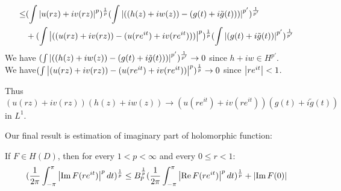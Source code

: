 \begin{remark}
{\begin{align*}
            \leq & (\int\left\lvert u(rz)+iv(rz)\right\rvert^p)^\frac{1}{p}  (\int\left\lvert((h(z)+iw(z))-(g(t)+i\tilde{g}(t)))\right\rvert^{p'})^\frac{1}{p'}                \\
                 & +(\int\left\lvert((u(rz)+iv(rz))-(u(re^{it})+iv(re^{it})))\right\rvert^p)^\frac{1}{p}  (\int\left\lvert(g(t)+i\tilde{g}(t))\right\rvert^{p'})^\frac{1}{p'}
        \end{align*}
        We have $(\int\left\lvert((h(z)+iw(z))-(g(t)+i\tilde{g}(t)))\right\rvert^{p'})^\frac{1}{p'}\to 0$ since $h+iw\in H^{p'}$.\\ We have$(\int\left\lvert(u(rz)+iv(rz))-(u(re^{it})+iv(re^{it}))\right\rvert^p)^\frac{1}{p}\to 0$ since $\left\lvert re^{it}\right\rvert<1$.}\par
    Thus $(u(rz)+iv(rz))(h(z)+iw(z))\to (u(re^{it})+iv(re^{it})) (g(t)+i\tilde{g}(t))$ in $L^1$.
\end{remark}
Our final result is estimation of imaginary part of holomorphic function:
\begin{corollary}
    If $F\in H(D)$, then for every $1<p<\infty$ and every $0\leq r<1$:
    \begin{equation*}
        (\frac{1}{2\pi}\int_{-\pi}^{\pi}{\left\lvert\operatorname{Im}{F(re^{it})}\right\rvert^p d t})^\frac{1}{p}\leq B_p^\frac{1}{p}(\frac{1}{2\pi}\int_{-\pi}^{\pi}{\left\lvert\operatorname{Re}{F(re^{it})}\right\rvert^p d t})^\frac{1}{p}+\left\lvert\operatorname{Im}{F(0)}\right\rvert
    \end{equation*}
\end{corollary}
